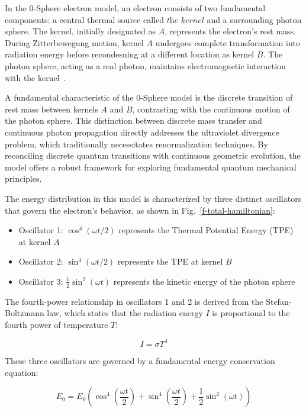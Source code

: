 \documentclass[%
 reprint,
 amsmath,amssymb,
 aps,
]{revtex4-1}
\numberwithin{equation}{section}%
\begin{document}
In the 0-Sphere electron model, an electron consists of two fundamental components: a central thermal source called $\textit{the kernel}$ and a surrounding photon sphere. The kernel, initially designated as $A$, represents the electron's rest mass. During Zitterbewegung motion, kernel $A$ undergoes complete transformation into radiation energy before recondesning at a different location as kernel $B$. The photon sphere, acting as a real photon, maintains electromagnetic interaction with the kernel~\cite{Hanamura2018, Hanamura2023}.

A fundamental characteristic of the 0-Sphere model is the discrete transition of rest mass between kernels $A$ and $B$, contrasting with the continuous motion of the photon sphere. This distinction between discrete mass transfer and continuous photon propagation directly addresses the ultraviolet divergence problem, which traditionally necessitates renormalization techniques. By reconciling discrete quantum transitions with continuous geometric evolution, the model offers a robust framework for exploring fundamental quantum mechanical principles.

The energy distribution in this model is characterized by three distinct oscillators that govern the electron's behavior, as shown in Fig.~\ref{f-total-hamiltonian}:

\begin{itemize}
    \item Oscillator 1: $\cos^4(\omega t/2)$ represents the Thermal Potential Energy (TPE) at kernel $A$
    \item Oscillator 2: $\sin^4(\omega t/2)$ represents the TPE at kernel $B$
    \item Oscillator 3: $\frac{1}{2}\sin^2(\omega t)$ represents the kinetic energy of the photon sphere
\end{itemize}

The fourth-power relationship in oscillators 1 and 2 is derived from the Stefan-Boltzmann law, which states that the radiation energy $I$ is proportional to the fourth power of temperature $T$:

\begin{equation}
    I = \sigma T^4
\end{equation}

These three oscillators are governed by a fundamental energy conservation equation:

\begin{equation}
E_{0} = E_{0} \left( \cos^{4} \left( \frac{\omega t}{2} \right) + \sin^{4} \left( \frac{\omega t}{2} \right) + \frac{1}{2} \sin^{2} (\omega t) \right)
\label{eq:hamiltonian_expanded}
\end{equation}
\end{document}
